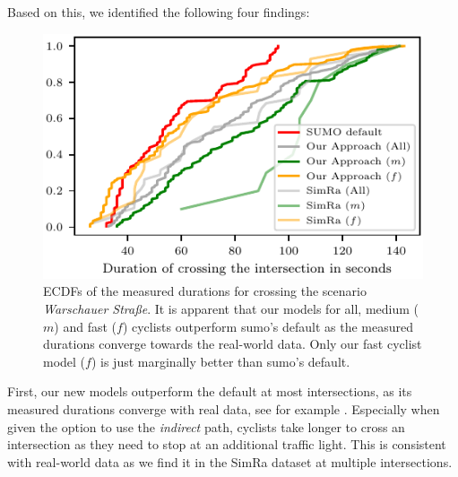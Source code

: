 Based on this, we identified the following four findings:
\begin{figure}
    \centering
    \includegraphics[width=0.7\columnwidth]{fig/im_warschauer_ecdf_every.pdf}
    \caption{%
        ECDFs of the measured durations for crossing the scenario \textit{Warschauer Straße}.
        It is apparent that our models for all, medium ($m$) and fast ($f$) cyclists outperform \ac{sumo}'s default as the measured durations converge towards the real-world data.
        Only our fast cyclist model ($f$) is just marginally better than \ac{sumo}'s default.
    }%
    \label{fig:im_warschauer}
\end{figure}
First, our new models outperform the default at most intersections, as its measured durations converge with real data, see for example .
Especially when given the option to use the \textit{indirect} path, cyclists take longer to cross an intersection as they need to stop at an additional traffic light.
This is consistent with real-world data as we find it in the SimRa dataset at multiple intersections.

